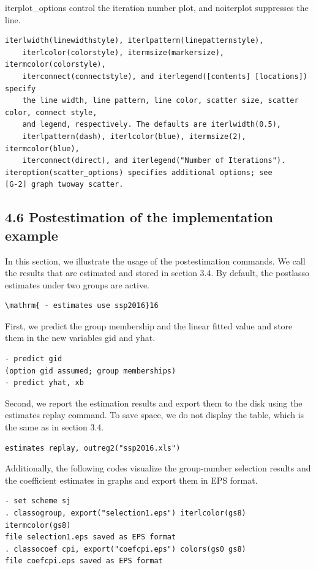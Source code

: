 \documentclass[10pt]{article}
\begin{document}
iterplot\_options control the iteration number plot, and noiterplot suppresses the line.

\begin{verbatim}
iterlwidth(linewidthstyle), iterlpattern(linepatternstyle),
    iterlcolor(colorstyle), itermsize(markersize), itermcolor(colorstyle),
    iterconnect(connectstyle), and iterlegend([contents] [locations]) specify
    the line width, line pattern, line color, scatter size, scatter color, connect style,
    and legend, respectively. The defaults are iterlwidth(0.5),
    iterlpattern(dash), iterlcolor(blue), itermsize(2), itermcolor(blue),
    iterconnect(direct), and iterlegend("Number of Iterations").
iteroption(scatter_options) specifies additional options; see
[G-2] graph twoway scatter.
\end{verbatim}

\subsection*{4.6 Postestimation of the implementation example}
In this section, we illustrate the usage of the postestimation commands. We call the results that are estimated and stored in section 3.4. By default, the postlasso estimates under two groups are active.

\begin{verbatim}
\mathrm{ - estimates use ssp2016}16
\end{verbatim}

First, we predict the group membership and the linear fitted value and store them in the new variables gid and yhat.

\begin{verbatim}
- predict gid
(option gid assumed; group memberships)
- predict yhat, xb
\end{verbatim}

Second, we report the estimation results and export them to the disk using the estimates replay command. To save space, we do not display the table, which is the same as in section 3.4.

\begin{verbatim}
estimates replay, outreg2("ssp2016.xls")
\end{verbatim}

Additionally, the following codes visualize the group-number selection results and the coefficient estimates in graphs and export them in EPS format.

\begin{verbatim}
- set scheme sj
. classogroup, export("selection1.eps") iterlcolor(gs8) itermcolor(gs8)
file selection1.eps saved as EPS format
. classocoef cpi, export("coefcpi.eps") colors(gs0 gs8)
file coefcpi.eps saved as EPS format
\end{verbatim}
\end{document}

